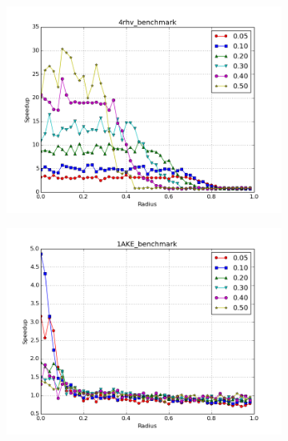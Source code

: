 \documentclass[review,preprint,12pt]{elsarticle}
\theoremstyle{definition}
\theoremstyle{remark}
\numberwithin{equation}{section}
\begin{document}
\begin{figure}[tbp]
    \centering
    \begin{subfigure}[b]{0.49\textwidth}
        \includegraphics[width=1\textwidth]{assets/4rhv_benchmark_cosine}
        \caption{}
    \end{subfigure}%
    \begin{subfigure}[b]{0.49\textwidth}
        \includegraphics[width=1\textwidth]{assets/1AKE_benchmark_cosine}
        \caption{}
    \end{subfigure}
    \begin{subfigure}[b]{0.49\textwidth}

\end{subfigure}
\end{figure}
\end{document}
